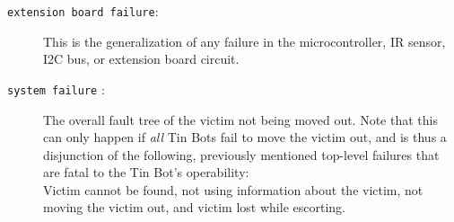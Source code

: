 \documentclass[a4paper,parskip,headheight=38pt]{scrartcl} %
\begin{document}
\begin{description}
\item[\texttt{extension board failure}:]
    This is the generalization of any failure in the microcontroller,
    IR sensor, I2C bus, or extension board circuit.
\item[\texttt{system failure} :]
    The overall fault tree of the victim not being moved out.  Note
    that this can only happen if \emph{all} Tin Bots fail to move the
    victim out, and is thus a disjunction of the following, previously
    mentioned top-level failures that are fatal to the Tin Bot's
    operability:
     \\
    Victim cannot be found, not using information
    about the victim, not moving the victim out, and
    victim lost while escorting.
\end{description}
\end{document}
